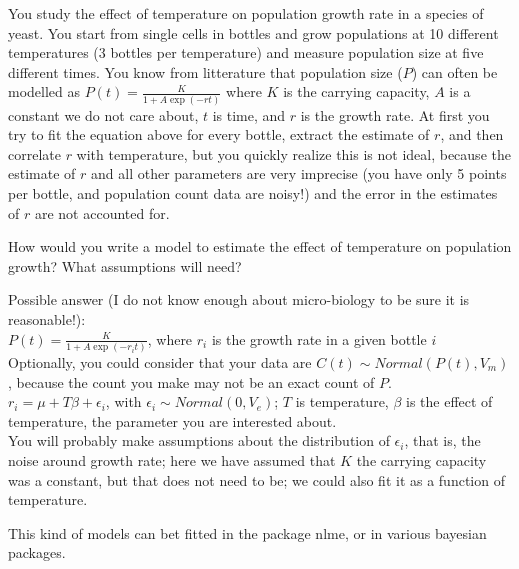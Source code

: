 \documentclass[12pt,a4paper]{scrartcl}\usepackage[]{graphicx}\usepackage[]{color}
\begin{document}
\begin{Exercise}[difficulty=1, title={Non-linear model}]
You study the effect of temperature on population growth rate in a species of yeast. You start from single cells in bottles and grow populations at 10 different temperatures (3 bottles per temperature) and measure population size at five different times. You know from litterature that population size ($P$) can often be modelled as $P(t) = \frac{K}{1+A\exp(-rt)}$ where $K$ is the carrying capacity, $A$ is a constant we do not care about, $t$ is time, and $r$ is the growth rate.
At first you try to fit the equation above for every bottle, extract the estimate of $r$, and then correlate $r$ with temperature, but you quickly realize this is not ideal, because the estimate of $r$ and all other parameters are very imprecise (you have only 5 points per bottle, and population count data are noisy!) and the error in the estimates of $r$ are not accounted for.

How would you write a model to estimate the effect of temperature on population growth? What assumptions will need?
\end{Exercise}
\begin{Answer}
Possible answer (I do not know enough about micro-biology to be sure it is reasonable!):\\
$P(t) = \frac{K}{1+A\exp(-r_i t)}$, where $r_i$ is the growth rate in a given bottle $i$\\
Optionally, you could consider that your data are $C(t) \sim Normal(P(t), V_m)$, because the count you make may not be an exact count of $P$.\\
$r_i = \mu + T \beta + \epsilon_i$, with  $\epsilon_i \sim Normal(0,V_e)$; $T$ is temperature, $\beta$ is the effect of temperature, the parameter you are interested about.\\
You will probably make assumptions about the distribution of $\epsilon_i$, that is, the noise around growth rate; here we have assumed that $K$ the carrying capacity was a constant, but that does not need to be; we could also fit it as a function of temperature.


This kind of models can bet fitted in the package nlme, or in various bayesian packages. 

\end{Answer}
\end{document}
